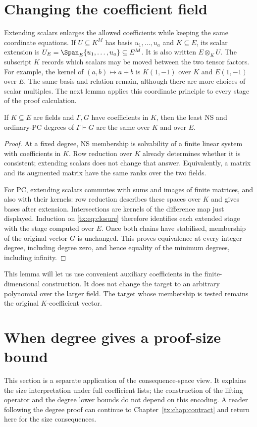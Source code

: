 \section{Changing the coefficient field}
Extending scalars enlarges the allowed coefficients while keeping the
same coordinate equations. If $U\subseteq K^M$ has basis
$u_1,\ldots,u_a$ and $K\subseteq E$, its scalar extension is
$U_E=\Span_E\{u_1,\ldots,u_a\}\subseteq E^M$.
It is also written $E\otimes_K U$. The subscript $K$ records which
scalars may be moved between the two tensor factors.
For example, the kernel of $(a,b)\mapsto a+b$ is $K(1,-1)$ over
$K$ and $E(1,-1)$ over $E$. The same basis and relation remain,
although there are more choices of scalar multiples.
The next lemma applies this coordinate principle to every stage
of the proof calculation.

\begin{lemma}\label{tx:lem:field}
If $K\subseteq E$ are fields and $\Gamma,G$ have coefficients in $K$,
then the least NS and ordinary-PC degrees of $\Gamma\vdash G$ are the
same over $K$ and over $E$.
\end{lemma}
\begin{proof}
At a fixed degree, NS membership is solvability of a finite linear
system with coefficients in $K$. Row reduction over $K$ already
determines whether it is consistent; extending scalars does not change
that answer. Equivalently, a matrix and its augmented matrix have the
same ranks over the two fields.

For PC, extending scalars commutes with sums and images of finite
matrices, and also with their kernels: row reduction describes these
spaces over $K$ and gives bases after extension. Intersections are
kernels of the difference map just displayed. Induction on
\eqref{tx:eq:closure} therefore identifies each extended stage with the
stage computed over $E$. Once both chains have stabilised, membership
of the original vector $G$ is unchanged. This proves equivalence at
every integer degree, including degree zero, and hence equality of
the minimum degrees, including infinity.
\end{proof}

This lemma will let us use convenient auxiliary coefficients in the
finite-dimensional construction. It does not change the target to an
arbitrary polynomial over the larger field. The target whose membership
is tested remains the original $K$-coefficient vector.

\section{When degree gives a proof-size bound}
This section is a separate application of the consequence-space view.
It explains the size interpretation under full coefficient lists; the
construction of the lifting operator and the degree lower bounds do
not depend on this encoding. A reader following the degree proof can
continue to Chapter~\ref{tx:chap:contract} and return here for the size
consequences.


